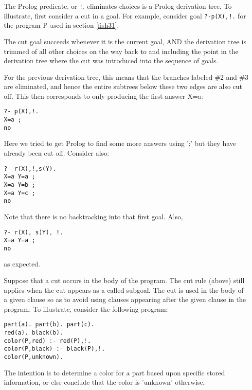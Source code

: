 \label{fish32}

The Prolog  predicate, or \verb'!', eliminates choices is a
Prolog derivation tree. To illustrate, first consider a cut in a goal. For
example, consider goal \verb|?-p(X),!.| for the program P used in section
\ref{fish31}.

\begin{framed}
The cut goal succeeds whenever it is the current goal, AND the derivation tree
is trimmed of all other choices on the way back to and including the point in
the derivation tree where the cut was introduced into the sequence of goals.
\end{framed}

For the previous derivation tree, this means that the branches labeled \#2 and
\#3 are eliminated, and hence the entire subtrees below these two edges are also
cut off. This then corresponds to only producing the first answer X=a:

\begin{verbatim}
?- p(X),!. 
X=a ; 
no 
\end{verbatim}

Here we tried to get Prolog to find some more answers using ';' but they have
already been cut off. Consider also:

\begin{verbatim}
?- r(X),!,s(Y). 
X=a Y=a ; 
X=a Y=b ; 
X=a Y=c ; 
no 
\end{verbatim}

Note that there is no backtracking into that first goal. Also,
\begin{verbatim}
?- r(X), s(Y), !. 
X=a Y=a ; 
no
\end{verbatim}
as expected.

Suppose that a cut occurs in the body of the program. The cut rule (above) still
applies when the cut appears as a called subgoal. The cut is used in the body of
a given clause so as to avoid using clauses appearing after the given clause in
the program. To illustrate, consider the following program:

\begin{verbatim}
part(a). part(b). part(c). 
red(a). black(b). 
color(P,red) :- red(P),!. 
color(P,black) :- black(P),!. 
color(P,unknown).
\end{verbatim}

The intention is to determine a color for a part based upon specific stored
information, or else conclude that the color is 'unknown' otherwise.

